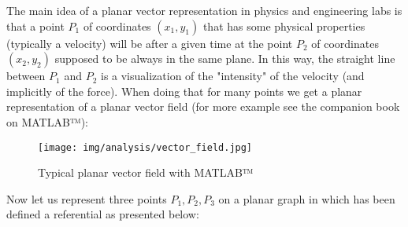 	The main idea of a planar vector representation in physics and engineering labs is that a point $P_1$ of coordinates $(x_1,y_1)$ that has some physical properties (typically a velocity) will be after a given time at the point $P_2$ of coordinates $(x_2,y_2)$ supposed to be always in the same plane. In this way, the straight line between $P_1$ and $P_2$ is a visualization of the "intensity" of the velocity (and implicitly of the force). When doing that for many points we get a planar representation of a planar vector field (for more example see the companion book on MATLAB™):	
	\begin{figure}[H]
		\centering
		\texttt{[image: img/analysis/vector\_field.jpg]}
		\caption[]{Typical planar vector field with MATLAB™}
	\end{figure}
	Now let us represent three points $P_1,P_2,P_3$ on a planar graph in which has been defined a referential as presented below:
